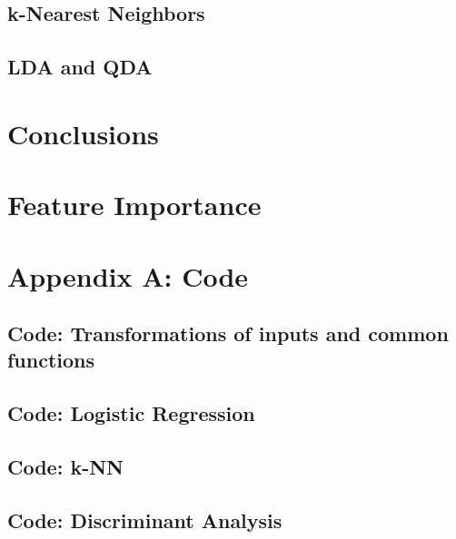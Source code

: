 \documentclass{article}
\begin{document}
\subsection{k-Nearest Neighbors}



\subsection{LDA and QDA}



\section{Conclusions}



\section{Feature Importance}



\newpage

\section*{Appendix A: Code}

\subsection{Code: Transformations of inputs and common functions}


\subsection{Code: Logistic Regression}


\subsection{Code: k-NN}


\subsection{Code: Discriminant Analysis}


 

\end{document}
